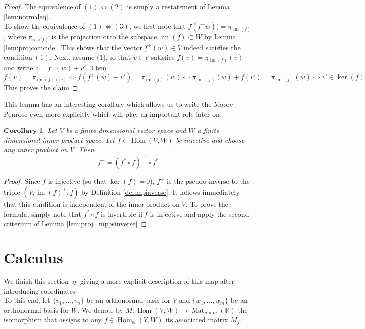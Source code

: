\documentclass{book}
\theoremstyle{plain}
\newtheorem{corollary}{Corollary}[section]
\theoremstyle{definition}
\renewcommand{\d}[1]{\mathbb{#1}}
\DeclareMathOperator{\Hom}{Hom}
\DeclareMathOperator{\im}{im}
\DeclareMathOperator{\Mat}{Mat}
\newcommand{\mor}{\longrightarrow}
\begin{document}
\begin{proof}
	The equivalence of $(1)\iff (2)$ is simply a restatement of Lemma \ref{lem:normaleq}.\\
	To show the equivalence of $(1)\iff (3)$, we first note that $f(f^+w))=\pi_{\im(f)}$, where $\pi_{im(f)}$ is the projection onto the subspace $\im(f)\subset W$ by Lemma \ref{lem:projcoincide}. This shows that the vector $f^+(w) \in V$ indeed satisfies the condition $(1)$. Next, assume (1), so that $v \in V$ satisfies $f(v)=\pi_{\im(f)}(v)$ and write $v= f^+(w)+v'$. Then\[
	f(v)=\pi_{\im(f)(w)}\iff f(f^+(w)+v')=\pi_{\im(f)}(w)\iff \pi_{\im(f)}(w)+f(v')=\pi_{\im(f)}(w)\iff v'\in \ker(f)
	\]
	This proves the claim
\end{proof}

This lemma has an interesting corollary which allows us to write the Moore-Penrose even more explicitly which will play an important role later on:

\begin{corollary}\label{cor:psinverse-injective}
Let $V$ be a finite dimensional vector space and $W$ a finite dimensional inner product space. Let $f \in \Hom(V,W)$ be injective and choose \emph{any} inner product on $V$. Then
\[
f^+ = (f^*\circ f)^{-1}\circ f^*
\] 
\end{corollary}

\begin{proof}
	Since $f$ is injective (so that $\ker(f)=0$), $f^+$ is the pseudo-inverse to the triple $(V,\im(f)^{\perp},f)$ by Definition \ref{def:mpinverse}. It follows immediately that this condition is independent of the inner product on $V$. To prove the formula, simply note that $f^*\circ f$ is invertible if $f$ is injective and apply the second criterium of Lemma \ref{lem:proj=mppsinverse}
\end{proof}

\chapter{Calculus}


\noindent We finish this section by giving a more explicit description of this map after introducing coordinates:\\
To this end, let $\big\{v_1,\ldots ,v_n \big\}$ be an orthonormal basis for $V$ and $\big\{w_1,\ldots, w_m\big\}$ be an orthonormal basis for $W$. We denote by $M: \Hom(V,W)\mor \Mat_{n\times m}(\d{R})$ the isomorphism that assigns to any $f \in \Hom_\d{R}(V,W)$ its associated matrix $M_f$.
\end{document}
